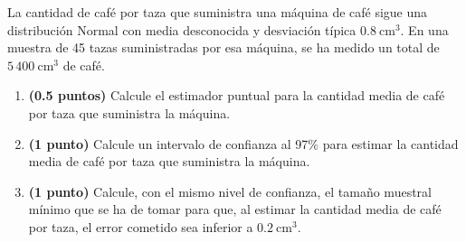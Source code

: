
La cantidad de café por taza que suministra una máquina de café sigue una distribución Normal con media desconocida y desviación típica $0.8\ \text{cm}^3$. En una muestra de 45 tazas suministradas por esa máquina, se ha medido un total de $5\,400\ \text{cm}^3$ de café.
\begin{enumerate}[label=\alph*)]
\item \textbf{(0.5 puntos)} Calcule el estimador puntual para la cantidad media de café por taza que suministra la máquina.
\item \textbf{(1 punto)} Calcule un intervalo de confianza al 97\% para estimar la cantidad media de café por taza que suministra la máquina.
\item \textbf{(1 punto)} Calcule, con el mismo nivel de confianza, el tamaño muestral mínimo que se ha de tomar para que, al estimar la cantidad media de café por taza, el error cometido sea inferior a $0.2\ \text{cm}^3$.
\end{enumerate}

